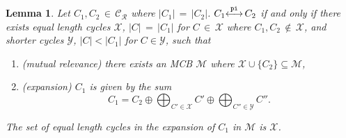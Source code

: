 \documentclass[fleqn,11pt]{article}
\newtheorem{lemma}[theorem]{Lemma}
\newcommand\calM{\mathcal{M}}
\newcommand\calX{\mathcal{X}}     %
\newcommand\calY{\mathcal{Y}}
\newcommand\RelCyc{\mathcal{C_R}} %
\newcommand\expand[2]{\mathcal{E}_{#1}\left(#2\right)}   %
\newcommand\pInt{ \stackrel{\tt pi}{\longleftrightarrow} }
\begin{document}
\begin{lemma}
	Let $C_1,C_2\,{\in}\,\RelCyc$ where $|C_1|\,{=}\,|C_2|$. $C_1{\pInt}\, C_2$ if and only if there exists equal length cycles $\calX$, $|C|\,{=}\,|C_1|$ for $C\,{\in}\,\calX$ where $C_1,C_2\,{\notin}\,\calX$, and shorter cycles $\calY$, $|C|{<}|C_1|$ for $C{\in}\calY$, such that
	\begin{enumerate}
		\item (mutual relevance) there exists an MCB $\calM$ where $\calX\cup\{C_2\}\subseteq\calM$,
		\item (expansion) $C_1$ is given by the sum 
		\begin{equation}
			C_1 = C_2\oplus \bigoplus_{C'\in\calX} C' \oplus \bigoplus_{C''\in\calY} C''.
			\label{eq:dir_exchg_split}
		\end{equation}
	\end{enumerate}
	The set of equal length cycles in the expansion of $C_1$ in $\calM$ is $\calX$.
	\label{Lem:dir_intchg_3}
\end{lemma}
\end{document}
